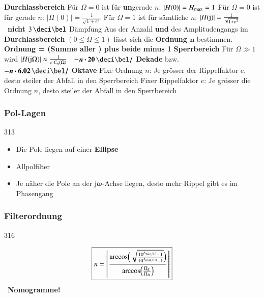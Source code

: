 \begin{outline}
    \1 \textbf{Durchlassbereich}
        \2 Für $\Omega = 0$ ist für \textbf{un}gerade $n$: $|H(0)| = H_{\rm max} = 1$
        \2 Für $\Omega = 0$ ist für gerade $n$: $|H(0)| = \frac{1}{\sqrt{1 + e^2}}$
        \2 Für $\Omega = 1$ ist für sämtliche $n$: $|H(\mathrm{j})| = \frac{1}{\sqrt{1 + e^2}}$ 
            \textrightarrow\ \textbf{nicht} $3 \, \deci \bel$ Dämpfung
        \2 Aus der Anzahl \textbf{ und } des Amplitudengangs im \textbf{Durchlassbereich} 
            $(0 \leq \Omega \leq 1)$ lässt sich die \textbf{Ordnung $\bm{n}$} bestimmen. \\
            \textbf{Ordnung = (Summe aller ) plus beide  minus 1}
    \1 \textbf{Sperrbereich}
        \2 Für $\Omega \gg 1$ wird $|H(\mathrm{j} \Omega)| \approx \frac{1}{e \cdot C_n(\Omega)}$ 
            \textrightarrow\ $\bm{- n \cdot 20 \, \deci \bel /}$ \textbf{Dekade} bzw.\\
            $\bm{- n \cdot 6.02 \, \deci \bel /}$ \textbf{Oktave}
        \2 Fixe Ordnung $n$: Je grösser der Rippelfaktor $e$, desto steiler der Abfall in den Sperrbereich
        \2 Fixer Rippelfaktor $e$: Je grösser die Ordnung $n$, desto steiler der Abfall in den Sperrbereich
\end{outline}


\begin{minipage}[t]{0.48\columnwidth}
    \subsubsection{Pol-Lagen}{313}

    \begin{itemize}
        \item Die Pole liegen auf einer \textbf{Ellipse}
        \item Allpolfilter
        \item Je näher die Pole an der $\mathrm{j} \omega$-Achse liegen, desto mehr Rippel gibt es im Phasengang %
    \end{itemize}
\end{minipage}
\hfill
\begin{minipage}[t]{0.48\columnwidth}
    \subsubsection{Filterordnung}{316}

    $$ \boxed{ n =  \left\lceil \frac{\arccos \Bigl( \sqrt{ \frac{10^{A_{\rm min / 10}} - 1}{10^{A_{\rm max / 10}} - 1} } \Bigr) }
        {\arccos \Bigl( \frac{\Omega_S}{\Omega_D} \Bigr)}  \right\rceil } $$
    \textrightarrow\ \textbf{Nomogramme!}
\end{minipage}


